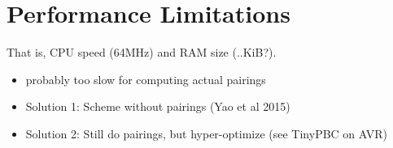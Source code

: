 \section{Performance Limitations}
That is, CPU speed (64MHz) and RAM size (..KiB?). 
\begin{itemize}
    \item probably too slow for computing actual pairings
    \item Solution 1: Scheme without pairings (Yao et al 2015) 
    \item Solution 2: Still do pairings, but hyper-optimize (see TinyPBC on AVR)
\end{itemize}